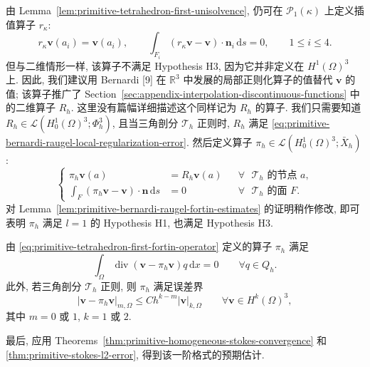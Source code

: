 由 Lemma~\ref{lem:primitive-tetrahedron-first-unisolvence},
仍可在 $\mathcal{P}_1(\kappa)$ 上定义插值算子 $r_\kappa$:
\[
r_\kappa\mathbf v(a_i)=\mathbf v(a_i),
\qquad
\int_{F_i}(r_\kappa\mathbf v-\mathbf v)\cdot\mathbf n_i\,\mathrm ds=0,
\qquad1\leq i\leq4.
\]
但与二维情形一样, 该算子不满足 Hypothesis H3, 因为它并非定义在
$H^1(\Omega)^3$ 上. 因此, 我们建议用 Bernardi [9] 在
$\mathbb R^3$ 中发展的局部正则化算子的值替代 $\mathbf v$ 的值;
该算子推广了 Section~\ref{sec:appendix-interpolation-discontinuous-functions}
中的二维算子 $R_h$. 这里没有篇幅详细描述这个同样记为 $R_h$ 的算子.
我们只需要知道
$R_h\in\mathcal L(H_0^1(\Omega)^3;\Phi_h^3)$, 且当三角剖分
$\mathcal{T}_h$ 正则时, $R_h$ 满足
\eqref{eq:primitive-bernardi-raugel-local-regularization-error}.
然后定义算子 $\pi_h\in\mathcal L(H_0^1(\Omega)^3;\bar X_h)$:
\begin{equation}\label{eq:primitive-tetrahedron-first-fortin-operator}
\left\{
\begin{aligned}
\pi_h\mathbf v(a)&=R_h\mathbf v(a)
&&\forall\text{ $\mathcal{T}_h$ 的节点 }a,\\
\int_F(\pi_h\mathbf v-\mathbf v)\cdot\mathbf n\,\mathrm ds&=0
&&\forall\text{ $\mathcal{T}_h$ 的面 }F.
\end{aligned}
\right.
\end{equation}
对 Lemma~\ref{lem:primitive-bernardi-raugel-fortin-estimates} 的证明稍作修改,
即可表明 $\pi_h$ 满足 $l=1$ 的 Hypothesis H1, 也满足 Hypothesis H3.

\setcounter{statement}{7}
\begin{Lemma}\label{lem:primitive-tetrahedron-first-fortin-estimates}
由 \eqref{eq:primitive-tetrahedron-first-fortin-operator} 定义的算子
$\pi_h$ 满足
\[
\int_\Omega\operatorname{div}(\mathbf v-\pi_h\mathbf v)q\,\mathrm dx=0
\qquad\forall q\in Q_h.
\]
此外, 若三角剖分 $\mathcal{T}_h$ 正则, 则 $\pi_h$ 满足误差界
\begin{equation}\label{eq:primitive-tetrahedron-first-interpolation-error}
|\mathbf v-\pi_h\mathbf v|_{m,\Omega}
\leq Ch^{k-m}|\mathbf v|_{k,\Omega}
\qquad\forall\mathbf v\in H^k(\Omega)^3,
\end{equation}
其中 $m=0$ 或 $1$, $k=1$ 或 $2$.
\end{Lemma}

最后, 应用 Theorems~\ref{thm:primitive-homogeneous-stokes-convergence} 和
\ref{thm:primitive-stokes-l2-error}, 得到该一阶格式的预期估计.

